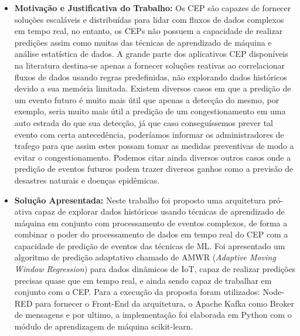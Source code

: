 \documentclass[tid,table]{texufpel} %
\begin{document}
\begin{itemize}
	\item \textbf{Motivação e Justificativa do Trabalho:} Os CEP são capazes de fornecer soluções escaláveis e distribuídas para lidar com fluxos de dados complexos em tempo real, no entanto, os CEPs  não possuem a capacidade de realizar predições assim como muitas das técnicas de aprendizado de máquina e análise estatística de dados. A grande parte dos aplicativos CEP disponíveis  na literatura destina-se apenas a fornecer soluções reativas ao correlacionar fluxos de dados usando regras predefinidas, não explorando dados históricos devido a sua memória limitada. Existem diversos casos em que a predição de um evento futuro é muito mais útil que apenas a detecção do mesmo, por exemplo, seria muito mais útil a predição de um congestionamento em uma auto estrada do que sua detecção, já que caso conseguíssemos prever tal evento com certa antecedência, poderíamos informar os administradores de trafego para que assim estes possam tomar as medidas preventivas de modo a evitar o congestionamento. Podemos citar ainda diversos outros casos onde a predição de eventos futuros podem trazer diversos ganhos como a previsão de desastres naturais e doenças epidêmicas. 
	
     \item \textbf{Solução Apresentada:} Neste trabalho foi proposto uma arquitetura pró-ativa capaz de explorar dados históricos usando técnicas de aprendizado de máquina em conjunto com processamento de eventos complexos, de forma a combinar o poder do processamento de dados em tempo real do CEP com a capacidade de predição de eventos das técnicas de ML. Foi apresentado um algoritmo de predição adaptativo chamado de AMWR (\textit{Adaptive Moving Window Regression}) para dados dinâmicos de IoT, capaz de realizar predições precisas quase que em tempo real, e ainda sendo capaz de trabalhar em conjunto com o CEP. Para a execução da proposta foram utilizados: Node-RED para fornecer o Front-End da arquitetura, o Apache Kafka como Broker de mensagens e por ultimo, a implementação foi elaborada em Python com o módulo de aprendizagem de máquina scikit-learn.  
     
     
     

\end{itemize}
\end{document}
